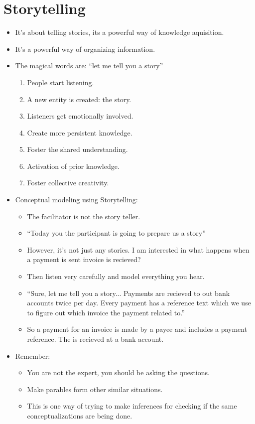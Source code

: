 \section{Storytelling}
\begin{itemize}
    \item It's about telling stories, its a powerful way of knowledge aquisition. 
    \item It's a powerful way of organizing information. 
    \item The magical words are: ``let me tell you a story''
        \begin{enumerate}
            \item People start listening.
            \item A new entity is created: the story. 
            \item Listeners get emotionally involved.
            \item Create more persistent knowledge. 
            \item Foster the shared understanding. 
            \item Activation of prior knowledge. 
            \item Foster collective creativity.
        \end{enumerate}
    
    \item Conceptual modeling using Storytelling:
        \begin{itemize}
            \item The facilitator is not the story teller. 
            \item ``Today you the participant is going to prepare us a story''
            \item However, it's not just any stories. I am interested in what happens when a payment is sent invoice is recieved? 
            \item Then listen very carefully and model everything you hear.
            \item ``Sure, let me tell you a story... Payments are recieved to out bank accounts twice per day. Every payment has a reference text which we use to figure out which invoice the payment related to.''
            \item So a payment for an invoice is made by a payee and includes a payment reference. The is recieved at a bank account.  
        \end{itemize}
    
    \item Remember:
        \begin{itemize}
            \item You are not the expert, you should be asking the questions. 
            \item Make parables form other similar situations. 
            \item This is one way of trying to make inferences for checking if the same conceptualizations are being done. 
        \end{itemize}
    

\end{itemize}
